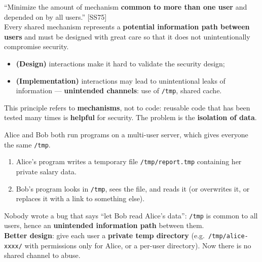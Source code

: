 \begin{defnbox}[title=Least common mechanism]
``Minimize the amount of mechanism \textbf{common to more than one user} and depended on
by all users.'' [SS75] \\
Every shared mechanism represents a \textbf{potential information path between users}
and must be designed with great care so that it does not unintentionally compromise
security.
\end{defnbox}

\begin{propbox}[title=Link with economy of mechanism]
\begin{itemize}
  \item \textbf{(Design)} interactions make it hard to validate the security design;
  \item \textbf{(Implementation)} interactions may lead to unintentional leaks of
        information --- \textbf{unintended channels}: use of \texttt{/tmp}, shared cache.
\end{itemize}
\end{propbox}

\begin{warnbox}[title={Mechanisms, not code}]
This principle refers to \textbf{mechanisms}, not to code: reusable code that has been
tested many times is \textbf{helpful} for security. The problem is the
\textbf{isolation of data}.
\end{warnbox}

\begin{exbox}[title=Two users sharing \texttt{/tmp}]
Alice and Bob both run programs on a multi-user server, which gives everyone the same
\texttt{/tmp}.
\begin{enumerate}
  \item Alice's program writes a temporary file \texttt{/tmp/report.tmp} containing her
        private salary data.
  \item Bob's program looks in \texttt{/tmp}, sees the file, and reads it (or overwrites
        it, or replaces it with a link to something else).
\end{enumerate}
Nobody wrote a bug that says ``let Bob read Alice's data'': \texttt{/tmp} is common to all
users, hence an \textbf{unintended information path} between them. \\
\textbf{Better design}: give each user a \textbf{private temp directory} (e.g.\
\texttt{/tmp/alice-xxxx/} with permissions only for Alice, or a per-user directory). Now
there is no shared channel to abuse.
\end{exbox}

